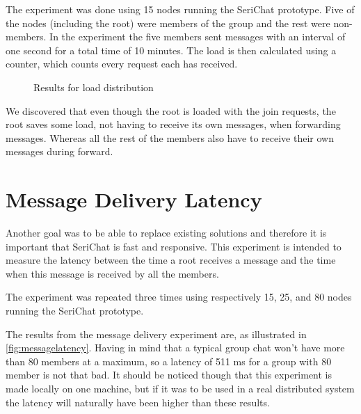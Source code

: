 The experiment was done using 15 nodes running the SeriChat prototype. Five of the nodes (including the root) were members of the group and the rest were non-members. In the experiment the five members sent messages with an interval of one second for a total time of 10 minutes. The load is then calculated using a counter, which counts every request each has received.
\begin{figure}[!h]
	\centering
{}
\caption{Results for load distribution} \label{fig:loaddistribution}
\end{figure}

We discovered that even though the root is loaded with the join requests, the root saves some load, not having to receive its own messages, when forwarding messages. Whereas all the rest of the members also have to receive their own messages during forward.

\section{Message Delivery Latency}
Another goal was to be able to replace existing solutions and therefore it is important that SeriChat is fast and responsive. 
This experiment is intended to measure the latency between the time a root receives a message and the time when this message is received by all the members. 

The experiment was repeated three times using respectively 15, 25, and 80 nodes running the SeriChat prototype. 

The results from the message delivery experiment are, as illustrated in \autoref{fig:messagelatency}. Having in mind that a typical group chat won't have more than 80 members at a maximum, so a latency of 511 ms for a group with 80 member is not that bad. It should be noticed though that this experiment is made locally on one machine, but if it was to be used in a real distributed system the latency will naturally have been higher than these results.   

